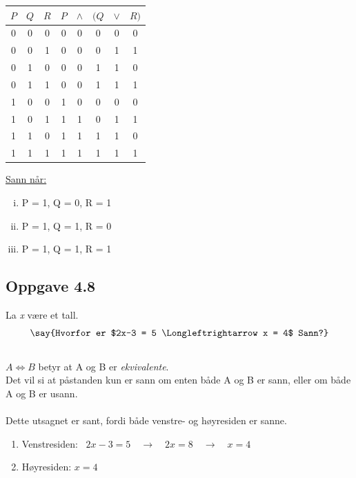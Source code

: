 \documentclass{article}
\begin{document}
\begin{minipage}[t]{0.48\textwidth}
    \centering
    
    \begin{tabular}{c c c | c c c c c}
        $P$ & $Q$ & $R$ & $P$ & $\wedge$ & $(Q$ & $\vee$ & $R)$ \\
        \hline
        0 & 0 & 0 & 0 & 0 & 0 & 0 & 0 \\
        0 & 0 & 1 & 0 & 0 & 0 & 1 & 1 \\
        0 & 1 & 0 & 0 & 0 & 1 & 1 & 0 \\
        0 & 1 & 1 & 0 & 0 & 1 & 1 & 1 \\
        1 & 0 & 0 & 1 & 0 & 0 & 0 & 0 \\
        \rowcolor{lightgray}
        1 & 0 & 1 & 1 & 1 & 0 & 1 & 1 \\
        \rowcolor{lightgray} 
        1 & 1 & 0 & 1 & 1 & 1 & 1 & 0 \\
        \rowcolor{lightgray} 
        1 & 1 & 1 & 1 & 1 & 1 & 1 & 1 \\
    \end{tabular}

    \vspace{1em}

    \underline{Sann når:}
    \begin{enumerate}[(i)]
    \centering
        \item P = 1, Q = 0, R = 1
        \item P = 1, Q = 1, R = 0
        \item P = 1, Q = 1, R = 1
    \end{enumerate}
\end{minipage}

\newpage

\subsection*{Oppgave 4.8}
La \textit{x} være et tall. 
\[\text{\say{Hvorfor er $2x-3 = 5 \Longleftrightarrow x = 4$ Sann?}}\] \\

\( A \Longleftrightarrow B\) betyr at A og B er \textit{ekvivalente}. \\
Det vil si at påstanden kun er sann om enten både A og B er sann, eller om både A og B er usann.
\\ \\
Dette utsagnet er sant, fordi både venstre- og høyresiden er sanne.
\begin{enumerate}[]
    \item Venstresiden: \quad \quad \ \(2x - 3 = 5 \quad \rightarrow \quad 2x = 8 \quad \rightarrow \quad x = 4\)
    \item Høyresiden: \quad \quad \quad \(x = 4\)
\end{enumerate}
\end{document}
